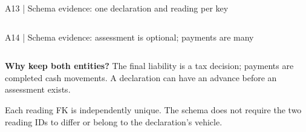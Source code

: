 \begin{frame}[fragile]{A13 | Schema evidence: one declaration and reading per key}
\begin{columns}[T,onlytextwidth]


\end{columns}
\end{frame}

\begin{frame}[fragile]{A14 | Schema evidence: assessment is optional; payments are many}
\begin{columns}[T,onlytextwidth]


\end{columns}
\medskip
\textbf{Why keep both entities?} The final liability is a tax decision; payments are completed cash movements. A declaration can have an advance before an assessment exists.
\par\smallskip
Each reading FK is independently unique. The schema does not require the two reading IDs to differ or belong to the declaration's vehicle.
\end{frame}

